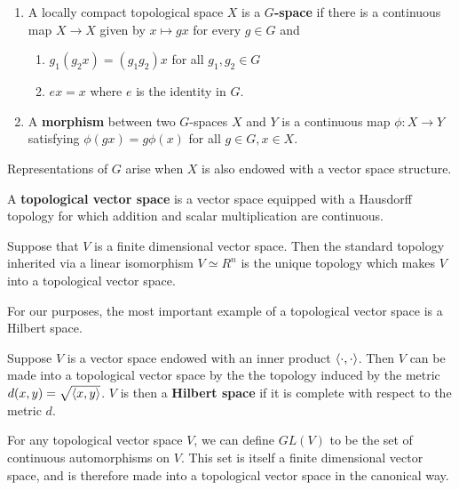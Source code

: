 \documentclass[a4paper]{article}
\begin{document}
\begin{defi}[G-space]\end{defi}
\begin{enumerate}
    \item A locally compact topological space $X$ is a $G$\textbf{-space} if there is a continuous map $X \to X$ given by $x \mapsto gx$ for every $g\in G$ and
    \begin{enumerate}
        \item $g_1 (g_2 x) = (g_1 g_2)x$ for all $g_1, g_2 \in G$
        \item $ex = x$ where $e$ is the identity in $G$.
    \end{enumerate} 
    \item A \textbf{morphism} between two $G$-spaces $X$ and $Y$ is a continuous map $\phi: X \to Y$ satisfying $\phi(gx) = g \phi(x)$ for all $g \in G, x \in X$. 
\end{enumerate}

Representations of $G$ arise when $X$ is also endowed with a vector space structure. 

\begin{defi}
    A \textbf{topological vector space} is a vector space equipped with a Hausdorff topology for which addition and scalar multiplication are continuous.
\end{defi}

\begin{eg}
    Suppose that $V$ is a finite dimensional vector space. Then the standard topology inherited via a linear isomorphism $V \simeq R^n$ is the unique topology which makes $V$ into a topological vector space. \cite{alex}
\end{eg}

For our purposes, the most important example of a topological vector space is a Hilbert space.

\begin{defi}
    Suppose $V$ is a vector space endowed with an inner product $\left\langle \cdot , \cdot \right\rangle$. Then $V$ can be made into a topological vector space by the the topology induced by the metric $d(x, y) = \sqrt{\left\langle x , y \right\rangle}$. $V$ is then a \textbf{Hilbert space} if it is complete with respect to the metric $d$. 
\end{defi}

For any topological vector space $V$, we can define $GL(V)$ to be the set of continuous automorphisms on $V$. This set is itself a finite dimensional vector space, and is therefore made into a topological vector space in the canonical way.
\end{document}
